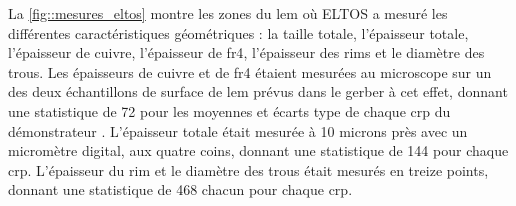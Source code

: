         La \autoref{fig::mesures_eltos} montre les zones du \gls{lem} où ELTOS a mesuré les différentes caractéristiques géométriques : la taille totale, l'épaisseur totale, l'épaisseur de cuivre, l'épaisseur de \gls{fr4}, l'épaisseur des rims et le diamètre des trous. Les épaisseurs de cuivre et de \gls{fr4} étaient mesurées au microscope sur un des deux échantillons de surface de \gls{lem} prévus dans le gerber à cet effet, donnant une statistique de 72 pour les moyennes et écarts type de chaque \gls{crp} du démonstrateur \SSS{}. L'épaisseur totale était mesurée à 10 microns près avec un micromètre digital, aux quatre coins, donnant une statistique de 144 pour chaque \gls{crp}. L'épaisseur du rim et le diamètre des trous était mesurés en treize points, donnant une statistique de 468 chacun pour chaque \gls{crp}.
                
                
